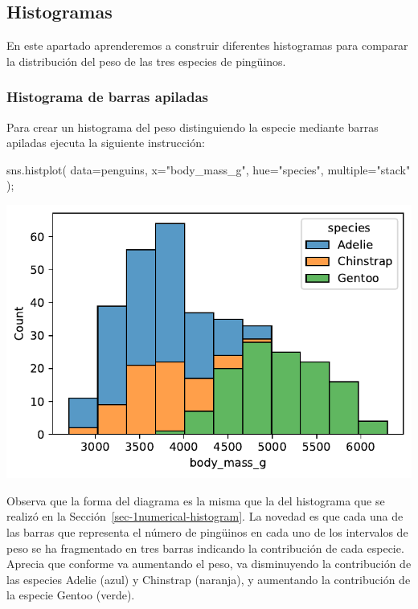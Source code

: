 \documentclass[
  a4paper,
  noprof,
  12pt,
  notoc,
  nosols,
  nobib]{mnye}
\newenvironment{Shaded}{\begin{snugshade}}{\end{snugshade}}
\newcommand{\NormalTok}[1]{\textcolor[rgb]{0.00,0.23,0.31}{#1}}
\newcommand{\OperatorTok}[1]{\textcolor[rgb]{0.37,0.37,0.37}{#1}}
\newcommand{\StringTok}[1]{\textcolor[rgb]{0.13,0.47,0.30}{#1}}
\theoremstyle{definition}
\theoremstyle{remark}
\begin{document}
\subsection{Histogramas}\label{histogramas}

En este apartado aprenderemos a construir diferentes histogramas para
comparar la distribución del peso de las tres especies de pingüinos.

\subsubsection{Histograma de barras
apiladas}\label{histograma-de-barras-apiladas}

Para crear un histograma del peso distinguiendo la especie mediante
barras apiladas ejecuta la siguiente instrucción:

\begin{Shaded}
\begin{Highlighting}[]
\NormalTok{sns.histplot(}
\NormalTok{    data}\OperatorTok{=}\NormalTok{penguins, }
\NormalTok{    x}\OperatorTok{=}\StringTok{"body\_mass\_g"}\NormalTok{, }
\NormalTok{    hue}\OperatorTok{=}\StringTok{"species"}\NormalTok{,}
\NormalTok{    multiple}\OperatorTok{=}\StringTok{"stack"}
\NormalTok{)}\OperatorTok{;}
\end{Highlighting}
\end{Shaded}

\includegraphics{chapters/numerical_by_categorical_files/figure-pdf/cell-4-output-1.pdf}

Observa que la forma del diagrama es la misma que la del histograma que
se realizó en la Sección~\ref{sec-1numerical-histogram}. La novedad es
que cada una de las barras que representa el número de pingüinos en cada
uno de los intervalos de peso se ha fragmentado en tres barras indicando
la contribución de cada especie. Aprecia que conforme va aumentando el
peso, va disminuyendo la contribución de las especies Adelie (azul) y
Chinstrap (naranja), y aumentando la contribución de la especie Gentoo
(verde).
\end{document}
